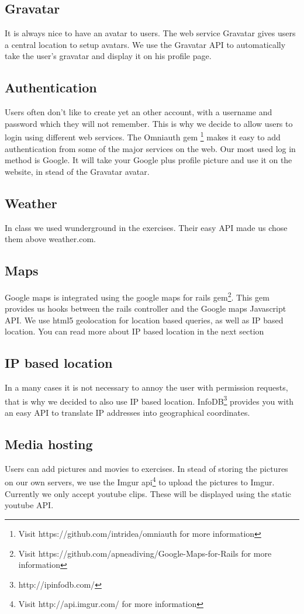 \documentclass[11pt,a4paper]{scrartcl}
\begin{document}
\subsection{Gravatar}
It is always nice to have an avatar to users. The web service Gravatar gives users a central location to setup avatars. We use the Gravatar API to automatically take the user's gravatar and display it on his profile page.
\subsection{Authentication}
Users often don't like to create yet an other account, with a username and password which they will not remember. This is why we decide to allow users to login using different web services. The Omniauth gem \footnote{Visit https://github.com/intridea/omniauth for more information} makes it easy to add authentication from some of the major services on the web. Our most used log in method is Google. It will take your Google plus profile picture and use it on the website, in stead of the Gravatar avatar.
\subsection{Weather}
In class we used wunderground in the exercises. Their easy API made us chose them above weather.com.
\subsection{Maps}
Google maps is integrated using the google maps for rails gem\footnote{Visit https://github.com/apneadiving/Google-Maps-for-Rails for more information}. This gem provides us hooks between the rails controller and the Google maps Javascript API. We use html5 geolocation for location based queries, as well as IP based location. You can read more about IP based location in the next section
\subsection{IP based location}
In a many cases it is not necessary to annoy the user with permission requests, that is why we decided to also use IP based location. InfoDB\footnote{http://ipinfodb.com/} provides you with an easy API to translate IP addresses into geographical coordinates.
\subsection{Media hosting}
Users can add pictures and movies to exercises. In stead of storing the pictures on our own servers, we use the Imgur api\footnote{Visit http://api.imgur.com/ for more information} to upload the pictures to Imgur. Currently we only accept youtube clips. These will be displayed using the static youtube API.
\end{document}
